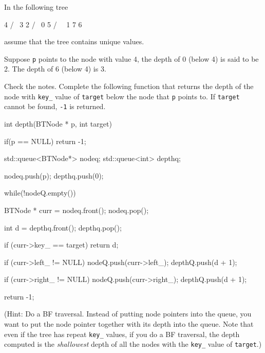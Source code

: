 \nextq
In the following tree
\begin{console}[fontsize=\footnotesize]
        4
       / \
      3   2
         / \
        0   5
       / \   \
      1   7   6
\end{console}
assume that the tree contains unique values.
\begin{enumerate}[nosep]
\li
Suppose \verb!p! points to the node with value 4,
the depth of 0 (below 4) is said to be 2.
The depth of 6 (below 4) is 3.
\end{enumerate}
Check the notes.
Complete the following function that returns the depth
of the node with \verb!key_! value of \verb!target!
below the node that \verb!p! points to.
If \verb!target! cannot be found, \verb!-1! is returned.
\\
\ANSWER
\begin{answercode}
int depth(BTNode * p, int target)
{
  if(p == NULL)
    return -1;

   std::queue<BTNode*> nodeq;
   std::queue<int> depthq;

   nodeq.push(p);
   depthq.push(0);

   while(!nodeQ.empty())
   {
     BTNode * curr = nodeq.front();
     nodeq.pop();

     int d = depthq.front();
     depthq.pop();

     if (curr->key_ == target)
       return d;

     if (curr->left_ != NULL)
     {
       nodeQ.push(curr->left_);
       depthQ.push(d + 1);
     }

     if (curr->right_ != NULL)
     {
       nodeQ.push(curr->right_);
       depthQ.push(d + 1);
     }
   }

   return -1;
}
\end{answercode}
(Hint: Do a BF traversal. Instead of putting node
pointers into the queue, you want to put the node pointer together
with its depth into the queue.
Note that even if the tree has repeat \verb!key_! values,
if you do a BF traversal,
the depth computed is the \textit{shallowest} depth of all the nodes with the
\verb!key_! value of \verb!target!.)

